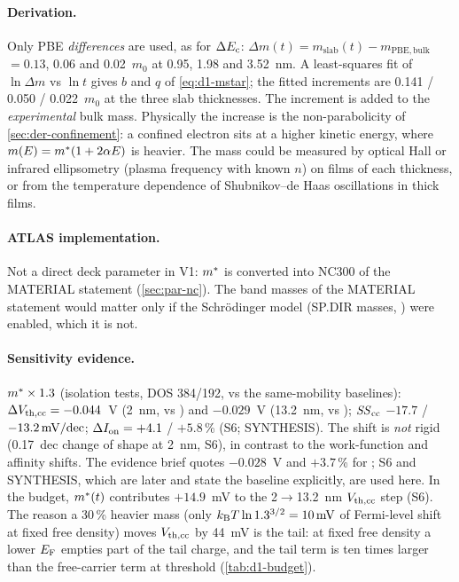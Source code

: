 \paragraph{Derivation.}
Only PBE \emph{differences} are used, as for $\Delta E_{\mathrm{c}}$: $\Delta m(t) = m_{\mathrm{slab}}(t) - m_{\mathrm{PBE,bulk}}$
$= 0.13$, 0.06 and 0.02~$m_0$ at 0.95, 1.98 and 3.52~nm. A least-squares fit of $\ln\Delta m$ vs $\ln t$ gives
$b$ and $q$ of \cref{eq:d1-mstar}; the fitted increments are 0.141 / 0.050 / 0.022~$m_0$ at the three slab
thicknesses. The increment is added to the \emph{experimental} bulk mass. Physically the increase is the
non-parabolicity of \cref{sec:der-confinement}: a confined electron sits at a higher kinetic energy, where
$m(E) = m^{*}(1+2\alpha E)$ is heavier. The mass could be measured by optical Hall or infrared
ellipsometry (plasma frequency with known $n$) on films of each thickness, or from the temperature dependence of
Shubnikov--de Haas oscillations in thick films.

\paragraph{ATLAS implementation.}
Not a direct deck parameter in V1: $m^{*}$ is converted into NC300 of the MATERIAL statement
\citep[p.~1340]{AtlasManual} (\cref{sec:par-nc}). The band masses of the MATERIAL statement would matter only if
the Schr\"odinger model (SP.DIR masses, \citealp[p.~1469]{AtlasManual}) were enabled, which it is not.

\paragraph{Sensitivity evidence.}
$m^{*}\times1.3$ (isolation tests, DOS 384/192, vs the same-mobility baselines): $\Delta V_{\mathrm{th,cc}} = -0.044$~V
(2~nm,  vs ) and $-0.029$~V (13.2~nm,  vs ); $\mathit{SS}_{\mathrm{cc}}$ $-17.7$ / $-13.2\,\mathrm{mV/dec}$;
$\Delta I_{\mathrm{on}} = +4.1$ / $+5.8$\,\% (S6; SYNTHESIS). The shift is \emph{not} rigid (0.17~dec change of shape at
2~nm, S6), in contrast to the work-function and affinity shifts. The evidence brief quotes $-0.028$~V and
$+3.7$\,\% for ; S6 and SYNTHESIS, which are later and state the baseline explicitly, are used here. In
the budget, $m^{*}(t)$ contributes $+14.9$~mV to the 2$\rightarrow$13.2~nm $V_{\mathrm{th,cc}}$ step (S6). The reason a
30\,\% heavier mass (only $k_{\mathrm{B}}T\ln 1.3^{3/2} = \SI{10}{mV}$ of Fermi-level shift at fixed free density) moves
$V_{\mathrm{th,cc}}$ by 44~mV is the tail: at fixed free density a lower $E_{\mathrm{F}}$ empties part of the tail charge, and the
tail term is ten times larger than the free-carrier term at threshold (\cref{tab:d1-budget}).

